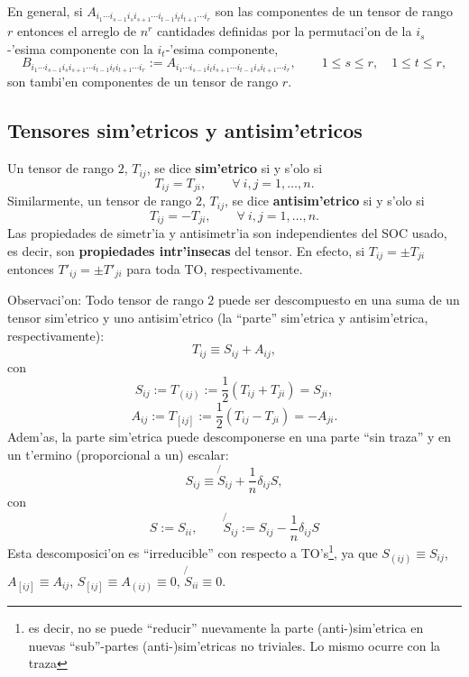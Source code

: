 En general, si $A_{i_1\cdots i_{s-1}i_si_{s+1}\cdots  i_{t-1}i_ti_{t+1}\cdots i_r}$ son las componentes de un tensor de rango $r$ entonces el arreglo de $n^r$ cantidades definidas por la permutaci'on de la $i_s$-'esima componente con la $i_{t}$-'esima componente,
\begin{equation}
B_{i_1\cdots i_{s-1}i_si_{s+1}\cdots  i_{t-1}i_ti_{t+1}\cdots i_r}:=A_{i_1\cdots i_{s-1}i_ti_{s+1}\cdots  i_{t-1}i_si_{t+1}\cdots i_r}, \qquad 1\le s\le r, \quad 1\le t\le r,
\end{equation}
son tambi'en componentes de un tensor de rango $r$.

\subsection{Tensores sim'etricos y antisim'etricos}
Un tensor de rango $2$, $T_{ij}$, se dice \textbf{sim'etrico} si y s'olo si
\begin{equation}
T_{ij}=T_{ji}, \qquad \forall\ i,j=1,\dots,n.
\end{equation}
Similarmente, un tensor de rango $2$, $T_{ij}$, se dice \textbf{antisim'etrico} si y s'olo si
\begin{equation}
T_{ij}=-T_{ji}, \qquad \forall\ i,j=1,\dots,n.
\end{equation}
Las propiedades de simetr'ia y antisimetr'ia son independientes del SOC usado, es decir, son \textbf{propiedades intr'insecas} del tensor. En efecto, si $T_{ij}=\pm T_{ji}$ entonces $T'_{ij}=\pm T'_{ji}$ para toda TO,  respectivamente.

Observaci'on: Todo tensor de rango $2$ puede ser descompuesto en una suma de un tensor sim'etrico y uno antisim'etrico (la ``parte'' sim'etrica y antisim'etrica, respectivamente):
\begin{equation}
T_{ij}\equiv S_{ij}+A_{ij},
\end{equation}
con 
\begin{equation}
S_{ij}:=T_{(ij)}:=\frac{1}{2}\left(T_{ij}+T_{ji}\right)=S_{ji}, 
\end{equation}
\begin{equation}
A_{ij}:=T_{[ij]}:=\frac{1}{2}\left(T_{ij}-T_{ji}\right)=-A_{ji}.
\end{equation}
Adem'as, la parte sim'etrica puede descomponerse en una parte ``sin traza'' y en un t'ermino (proporcional a un) escalar:
\begin{equation}
S_{ij}\equiv \not{\!S}_{ij} +\frac{1}{n}\delta_{ij}S,
\end{equation}
con
\begin{equation}
S:=S_{ii}, \qquad \not{\!S}_{ij}:=S_{ij}- \frac{1}{n}\delta_{ij}S
\end{equation}
Esta descomposici'on es ``irreducible'' con respecto a TO's\footnote{es decir, no se puede  ``reducir'' nuevamente la parte (anti-)sim'etrica en nuevas ``sub''-partes (anti-)sim'etricas no triviales. Lo mismo ocurre con la traza}, ya que $S_{(ij)}\equiv S_{ij}$, $A_{[ij]}\equiv A_{ij}$, $S_{[ij]}\equiv A_{(ij)}\equiv 0$, $\not{\!S}_{ii}\equiv 0$.

